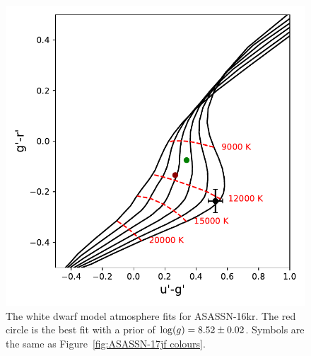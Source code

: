 \begin{figure}
    \centering
    \includegraphics[width=\columnwidth, trim={0 0mm 0 0},clip]{figures/results/three_cvs_with_weird_colours/ASASSN-16kr/PhysicalParams/ASASSN-16kr_colourPlot_alpha_beta.pdf}
    \caption{The white dwarf model atmosphere fits for ASASSN-16kr. The red circle is the best fit with a prior of ${\rm log}(g)=8.52\pm0.02$. Symbols are the same as Figure~\ref{fig:ASASSN-17jf colours}.}
    \label{fig:ASASSN-16kr colours}
\end{figure}
